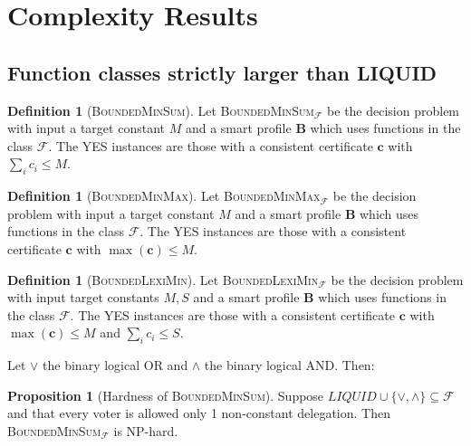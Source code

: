 \documentclass[11pt,a4paper, titlepage]{article}
\theoremstyle{definition}
\newtheorem{definition}[theorem]{Definition}
\newtheorem{proposition}[theorem]{Proposition}
\let\vec\mathbf
\begin{document}
\newpage



\section{Complexity Results}

\subsection{Function classes strictly larger than LIQUID}

\begin{definition}[\textsc{BoundedMinSum}]
    Let \textsc{BoundedMinSum}$_\mathcal{F}$ be the decision problem with input a target constant $M$ and a smart profile $\mathbf{B}$ which uses functions in the class $\mathcal{F}$. The YES instances are those with a consistent certificate  $\vec{c}$ with $\sum_i c_i \leq M$. 
\end{definition}

\begin{definition}[\textsc{BoundedMinMax}]
    Let \textsc{BoundedMinMax}$_\mathcal{F}$ be the decision problem with input a target constant $M$ and a smart profile $\mathbf{B}$ which uses functions in the class $\mathcal{F}$. The YES instances are those with a consistent certificate  $\vec{c}$ with $\max(\vec{c}) \leq M$. 
\end{definition}

\begin{definition}[\textsc{BoundedLexiMin}]
    Let \textsc{BoundedLexiMin}$_\mathcal{F}$ be the decision problem with input target constants $M, S$ and a smart profile $\mathbf{B}$ which uses functions in the class $\mathcal{F}$. The YES instances are those with a consistent certificate  $\vec{c}$ with $\max (\vec{c}) \leq M$ and $\sum_i c_i \leq S$.
\end{definition}

Let $\lor$ the binary logical OR and $\land$ the binary logical AND. Then:

\begin{proposition}[Hardness of \textsc{BoundedMinSum}]
    Suppose $\mathit{LIQUID} \cup \{\lor, \land\} \subseteq \mathcal{F}$ and that every voter is allowed only 1 non-constant delegation. Then \textsc{BoundedMinSum}$_\mathcal{F}$ is NP-hard.    
\end{proposition}
\end{document}
